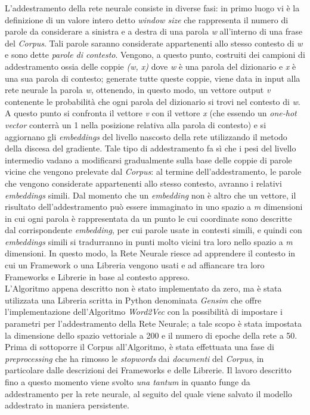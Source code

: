 L'addestramento della rete neurale consiste in diverse fasi: in primo luogo vi è la definizione di un valore intero detto \emph{window size} che rappresenta il numero di parole da considerare a sinistra e a destra di una parola \emph{w} all'interno di una frase del \emph{Corpus}. Tali parole saranno considerate appartenenti allo stesso contesto di \emph{w} e sono dette \emph{parole di contesto}. Vengono, a questo punto, costruiti dei campioni di addestramento ossia delle coppie \emph{(w, x)} dove \emph{w} è una parola del dizionario e \emph{x} è una sua parola di contesto; generate tutte queste coppie, viene data in input alla rete neurale la parola \emph{w}, ottenendo, in questo modo, un vettore output \emph{v} contenente le probabilità che ogni parola del dizionario si trovi nel contesto di \emph{w}. A questo punto si confronta il vettore \emph{v} con il vettore \emph{x} (che essendo un \emph{one-hot vector} conterrà un 1 nella posizione relativa alla parola di contesto) e si aggiornano gli \emph{embeddings} del livello nascosto della rete utilizzando il metodo della discesa del gradiente. Tale tipo di addestramento fa sì che i pesi del livello intermedio vadano a modificarsi gradualmente sulla base delle coppie di parole vicine che vengono prelevate dal \emph{Corpus}: al termine dell'addestramento, le parole che vengono considerate appartenenti allo stesso contesto, avranno i relativi \emph{embeddings} simili. Dal momento che un \emph{embedding} non è altro che un vettore, il risultato dell'addestramento può essere immaginato in uno spazio a \emph{m} dimensioni in cui ogni parola è rappresentata da un punto le cui coordinate sono descritte dal corrispondente \emph{embedding}, per cui parole usate in contesti simili, e quindi con \emph{embeddings} simili si tradurranno in punti molto vicini tra loro nello spazio a \emph{m} dimensioni. In questo modo, la Rete Neurale riesce ad apprendere il contesto in cui un Framework o una Libreria vengono usati e ad affiancare tra loro Frameworks e Librerie in base al contesto appreso.\\
L'Algoritmo appena descritto non è stato implementato da zero, ma è stata utilizzata una Libreria scritta in Python denominata \emph{Gensim} \cite{rehurek_lrec} che offre l'implementazione dell'Algoritmo \emph{Word2Vec} con la possibilità di impostare i parametri per l'addestramento della Rete Neurale; a tale scopo è stata impostata la dimensione dello spazio vettoriale a 200 e il numero di epoche della rete a 50. Prima di sottoporre il Corpus all'Algoritmo, è stata effettuata una fase di \emph{preprocessing} che ha rimosso le \emph{stopwords} dai \emph{documenti} del \emph{Corpus}, in particolare dalle descrizioni dei Frameworks e delle Librerie. Il lavoro descritto fino a questo momento viene svolto \emph{una tantum} in quanto funge da addestramento per la rete neurale, al seguito del quale viene salvato il modello addestrato in maniera persistente. 
